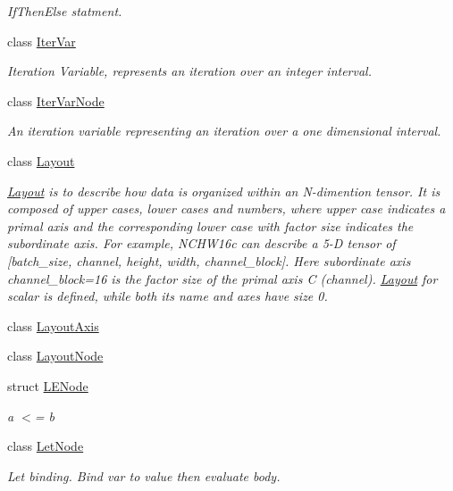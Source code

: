 \begin{DoxyCompactItemize}
\begin{DoxyCompactList}\small\item\em If\+Then\+Else statment. \end{DoxyCompactList}\item 
class \hyperlink{classtvm_1_1tir_1_1IterVar}{Iter\+Var}
\begin{DoxyCompactList}\small\item\em Iteration Variable, represents an iteration over an integer interval. \end{DoxyCompactList}\item 
class \hyperlink{classtvm_1_1tir_1_1IterVarNode}{Iter\+Var\+Node}
\begin{DoxyCompactList}\small\item\em An iteration variable representing an iteration over a one dimensional interval. \end{DoxyCompactList}\item 
class \hyperlink{classtvm_1_1tir_1_1Layout}{Layout}
\begin{DoxyCompactList}\small\item\em \hyperlink{classtvm_1_1tir_1_1Layout}{Layout} is to describe how data is organized within an N-\/dimention tensor. It is composed of upper cases, lower cases and numbers, where upper case indicates a primal axis and the corresponding lower case with factor size indicates the subordinate axis. For example, N\+C\+H\+W16c can describe a 5-\/D tensor of \mbox{[}batch\+\_\+size, channel, height, width, channel\+\_\+block\mbox{]}. Here subordinate axis channel\+\_\+block=16 is the factor size of the primal axis C (channel). \hyperlink{classtvm_1_1tir_1_1Layout}{Layout} for scalar is defined, while both its name and axes have size 0. \end{DoxyCompactList}\item 
class \hyperlink{classtvm_1_1tir_1_1LayoutAxis}{Layout\+Axis}
\item 
class \hyperlink{classtvm_1_1tir_1_1LayoutNode}{Layout\+Node}
\item 
struct \hyperlink{structtvm_1_1tir_1_1LENode}{L\+E\+Node}
\begin{DoxyCompactList}\small\item\em a $<$= b \end{DoxyCompactList}\item 
class \hyperlink{classtvm_1_1tir_1_1LetNode}{Let\+Node}
\begin{DoxyCompactList}\small\item\em Let binding. Bind var to value then evaluate body. \end{DoxyCompactList}\item 

\end{DoxyCompactItemize}
